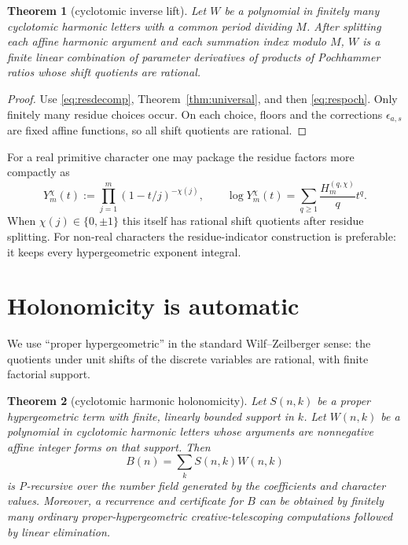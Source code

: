 \documentclass[11pt]{article}
\newtheorem{theorem}{Theorem}[section]
\theoremstyle{definition}
\theoremstyle{remark}
\begin{document}
\begin{theorem}[cyclotomic inverse lift]\label{thm:cyclolift}
Let $W$ be a polynomial in finitely many cyclotomic harmonic letters with a common period
dividing $M$.  After splitting each affine harmonic argument and each summation index
modulo $M$, $W$ is a finite linear combination of parameter derivatives of products of
Pochhammer ratios whose shift quotients are rational.
\end{theorem}

\begin{proof}
Use \eqref{eq:resdecomp}, Theorem~\ref{thm:universal}, and then
\eqref{eq:respoch}.  Only finitely many residue choices occur.  On each choice, floors and
the corrections $\epsilon_{a,s}$ are fixed affine functions, so all shift quotients are
rational.
\end{proof}

For a real primitive character one may package the residue factors more compactly as
\begin{equation}\label{eq:Ychi}
 Y_m^\chi(t):=\prod_{j=1}^m(1-t/j)^{-\chi(j)},\qquad
 \log Y_m^\chi(t)=\sum_{q\ge1}\frac{H_m^{(q,\chi)}}q t^q.
\end{equation}
When $\chi(j)\in\{0,\pm1\}$ this itself has rational shift quotients after residue
splitting.  For non-real characters the residue-indicator construction is preferable: it
keeps every hypergeometric exponent integral.

\section{Holonomicity is automatic}

We use ``proper hypergeometric'' in the standard Wilf--Zeilberger sense: the quotients
under unit shifts of the discrete variables are rational, with finite factorial support.

\begin{theorem}[cyclotomic harmonic holonomicity]\label{thm:holonomic}
Let $S(n,k)$ be a proper hypergeometric term with finite, linearly bounded support in $k$.
Let $W(n,k)$ be a polynomial in cyclotomic harmonic letters whose arguments are
nonnegative affine integer forms on that support.  Then
\begin{equation}\label{eq:BW}
 B(n)=\sum_kS(n,k)W(n,k)
\end{equation}
is P-recursive over the number field generated by the coefficients and character values.
Moreover, a recurrence and certificate for $B$ can be obtained by finitely many ordinary
proper-hypergeometric creative-telescoping computations followed by linear elimination.
\end{theorem}
\end{document}
